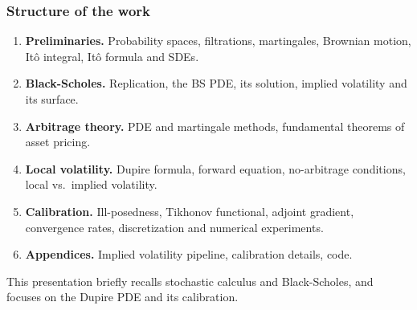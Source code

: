 \begin{frame}
\frametitle{Structure of the work}
\begin{scriptsize}
\begin{enumerate}
\item[2--3.] \textbf{Preliminaries.} Probability spaces, filtrations, martingales, Brownian motion,
It\^{o} integral, It\^{o} formula and SDEs.
\item[4.] \textbf{Black-Scholes.} Replication, the BS PDE, its solution, implied volatility and its surface.
\item[5.] \textbf{Arbitrage theory.} PDE and martingale methods, fundamental theorems of asset pricing.
\item[6.] \textbf{Local volatility.} Dupire formula, forward equation, no-arbitrage conditions,
local vs.\ implied volatility.
\item[7.] \textbf{Calibration.} Ill-posedness, Tikhonov functional, adjoint gradient,
convergence rates, discretization and numerical experiments.
\item[A--C.] \textbf{Appendices.} Implied volatility pipeline, calibration details, code.
\end{enumerate}
\end{scriptsize}

\begin{center}
\end{center}
\begin{scriptsize}
This presentation briefly recalls stochastic calculus and Black-Scholes, and focuses on the Dupire PDE and its calibration.
\end{scriptsize}
\end{frame}
